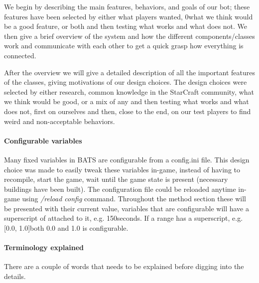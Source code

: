 We begin by describing the main features, behaviors, and goals of our bot; these features have been selected by either what players wanted, 0what we think would be a good feature, or both and then testing what works and what does not. We then give a brief overview of the system and how the different components/classes work and communicate with each other to get a quick grasp how everything is connected.

After the overview we will give a detailed description of all the important features of the classes, giving motivations of our design choices. The design choices were selected by either research, common knowledge in the StarCraft community, what we think would be good, or a mix of any and then testing what works and what does not, first on ourselves and then, close to the end, on our test players to find weird and non-acceptable behaviors.

\paragraph{Configurable variables}
Many fixed variables in BATS are configurable from a config.ini file. This design choice was made to easily tweak these variables in-game, instead of having to recompile, start the game, wait until the game state is present (necessary buildings have been built). The configuration file could be reloaded anytime in-game using \emph{/reload config} command. Throughout the method section these will be presented with their current value, variables that are configurable will have a superscript of \conf attached to it, e.g. 150\conf seconds. If a range has a superscript, e.g. [0.0, 1.0]\conf both 0.0 and 1.0 is configurable.

\paragraph{Terminology explained}
There are a couple of words that needs to be explained before digging into the details.

